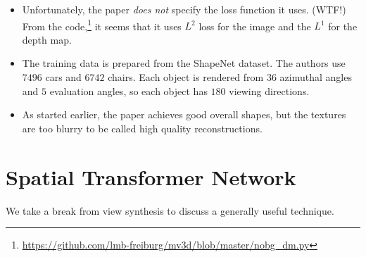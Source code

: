 \documentclass[10pt]{article}
\begin{document}
\begin{itemize}
  	\item Unfortunately, the paper \emph{does not} specify the loss function it uses. (WTF!) From the code,\footnote{\url{https://github.com/lmb-freiburg/mv3d/blob/master/nobg_dm.py}} it seems that it uses $L^2$ loss for the image and the $L^1$ for the depth map.

  	\item The training data is prepared from the ShapeNet dataset. The authors use $7496$ cars and $6742$ chairs. Each object is rendered from $36$ azimuthal angles and $5$ evaluation angles, so each object has $180$ viewing directions.

  	\item As started earlier, the paper achieves good overall shapes, but the textures are too blurry to be called high quality reconstructions.
  \end{itemize}

  \section{Spatial Transformer Network}

  We take a break from view synthesis to discuss a generally useful technique.
\end{document}
